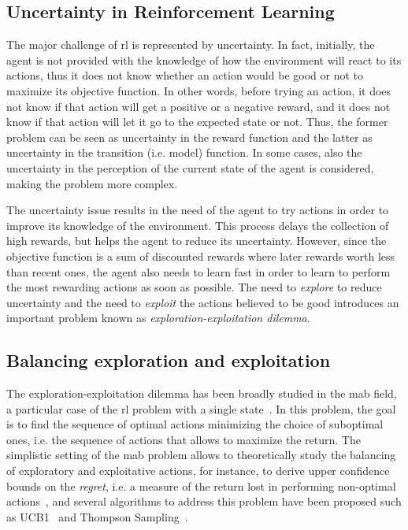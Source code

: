 \subsection{Uncertainty in Reinforcement Learning}
The major challenge of \gls{rl} is represented by uncertainty. In fact, initially, the agent is not provided with the knowledge of how the environment will react to its actions, thus it does not know whether an action would be good or not to maximize its objective function. In other words, before trying an action, it does not know if that action will get a positive or a negative reward, and it does not know if that action will let it go to the expected state or not. Thus, the former problem can be seen as uncertainty in the reward function and the latter as uncertainty in the transition (i.e. model) function. In some cases, also the uncertainty in the perception of the current state of the agent is considered, making the problem more complex.

The uncertainty issue results in the need of the agent to try actions in order to improve its knowledge of the environment. This process delays the collection of high rewards, but helps the agent to reduce its uncertainty. However, since the objective function is a sum of discounted rewards where later rewards worth less than recent ones, the agent also needs to learn fast in order to learn to perform the most rewarding actions as soon as possible. The need to \textit{explore} to reduce uncertainty and the need to \textit{exploit} the actions believed to be good introduces an important problem known as \textit{exploration-exploitation dilemma}.

\subsection{Balancing exploration and exploitation}
The exploration-exploitation dilemma has been broadly studied in the \gls{mab} field, a particular case of the \gls{rl} problem with a single state~\cite{lai1985asymptotically}. In this problem, the goal is to find the sequence of optimal actions minimizing the choice of suboptimal ones, i.e. the sequence of actions that allows to maximize the return. The simplistic setting of the \gls{mab} problem allows to theoretically study the balancing of exploratory and exploitative actions, for instance, to derive upper confidence bounds on the \textit{regret}, i.e. a measure of the return lost in performing non-optimal actions~\cite{bubeck2012regret, agrawal2012analysis, vermorel2005multi}, and several algorithms to address this problem have been proposed such as UCB1~\cite{auer2002finite} and Thompson Sampling~\cite{thompson1933likelihood}.

